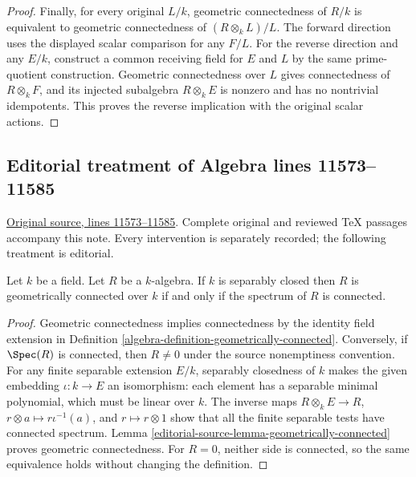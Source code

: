 \begin{proof}
Finally, for every original $L/k$,
geometric connectedness of $R/k$
is equivalent to geometric
connectedness of $(R\otimes_k L)/L$.
The forward direction uses
the displayed scalar comparison
for any $F/L$. For the reverse
direction and any $E/k$, construct
a common receiving field for
$E$ and $L$ by the same
prime-quotient construction.
Geometric connectedness over
$L$ gives connectedness of
$R\otimes_k F$, and its
injected subalgebra $R\otimes_k E$
is nonzero and has no nontrivial
idempotents. This proves the
reverse implication with the
original scalar actions.
\end{proof}


\subsection{Editorial treatment of Algebra lines 11573--11585}

\hypertarget{algebra-context-151}{}

\noindent\href{https://github.com/stacks/stacks-project/blob/a04446e57ec1fbc252a871afcec7752fb2807b14/algebra.tex\#L11573}{Original source, lines 11573--11585}. Complete original and reviewed TeX passages accompany this note. Every intervention is separately recorded; the following treatment is editorial.


\begin{lemma}
\label{editorial-source-lemma-separably-closed-connected-implies-geometric}
Let $k$ be a field.
Let $R$ be a $k$-algebra.
If $k$ is separably closed then $R$ is
geometrically connected over $k$ if and only if the
spectrum of $R$ is connected.
\end{lemma}

\begin{proof}
Geometric connectedness implies
connectedness by the identity field
extension in Definition
\ref{algebra-definition-geometrically-connected}.
Conversely, if $\Spec(R)$ is
connected, then $R\neq0$ under
the source nonemptiness convention.
For any finite separable extension
$E/k$, separably closedness of $k$
makes the given embedding $\iota:k\to E$
an isomorphism: each element has
a separable minimal polynomial,
which must be linear over $k$.
The inverse maps
$R\otimes_k E\to R$, $r\otimes a\mapsto r\iota^{-1}(a)$,
and $r\mapsto r\otimes1$ show
that all the finite separable
tests have connected spectrum.
Lemma \ref{editorial-source-lemma-geometrically-connected}
proves geometric connectedness.
For $R=0$, neither side is
connected, so the same equivalence
holds without changing the definition.
\end{proof}


